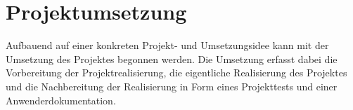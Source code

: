 \section{Projektumsetzung}
\label{sec:Projektumsetzung}

Aufbauend auf einer konkreten Projekt- und Umsetzungsidee kann mit der
Umsetzung des Projektes begonnen werden.
Die Umsetzung erfasst dabei die Vorbereitung der Projektrealisierung, die eigentliche Realisierung des Projektes
und die Nachbereitung der Realisierung in Form eines Projekttests und einer Anwenderdokumentation. 






